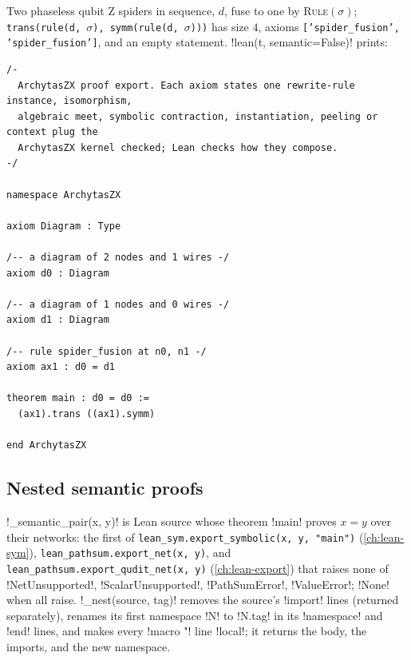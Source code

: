 \begin{example}
Two phaseless qubit Z spiders in sequence, $d$, fuse to one by \textsc{Rule}$(\sigma)$; \texttt{trans(\allowbreak{}rule(\allowbreak{}d,\allowbreak{} $\sigma$),\allowbreak{} symm(\allowbreak{}rule(\allowbreak{}d,\allowbreak{} $\sigma$)))} has size $4$, axioms \texttt{['spider\_\allowbreak{}fusion',\allowbreak{} 'spider\_\allowbreak{}fusion']}, and an empty statement. \py!lean(t, semantic=False)! prints:
\begin{lstlisting}[style=lean]
/-
  ArchytasZX proof export. Each axiom states one rewrite-rule instance, isomorphism,
  algebraic meet, symbolic contraction, instantiation, peeling or context plug the
  ArchytasZX kernel checked; Lean checks how they compose.
-/

namespace ArchytasZX

axiom Diagram : Type

/-- a diagram of 2 nodes and 1 wires -/
axiom d0 : Diagram

/-- a diagram of 1 nodes and 0 wires -/
axiom d1 : Diagram

/-- rule spider_fusion at n0, n1 -/
axiom ax1 : d0 = d1

theorem main : d0 = d0 :=
  (ax1).trans ((ax1).symm)

end ArchytasZX
\end{lstlisting}
\end{example}

\subsection{Nested semantic proofs}\label{sec:kernel-opaque-semantic}

\py!_semantic_pair(x, y)! is Lean source whose theorem \lean!main! proves $x=y$ over their networks: the first of \texttt{lean\_\allowbreak{}sym.\allowbreak{}export\_\allowbreak{}symbolic(\allowbreak{}x,\allowbreak{} y,\allowbreak{} "main")} (\cref{ch:lean-sym}), \texttt{lean\_\allowbreak{}pathsum.\allowbreak{}export\_\allowbreak{}net(\allowbreak{}x,\allowbreak{} y)}, and \texttt{lean\_\allowbreak{}pathsum.\allowbreak{}export\_\allowbreak{}qudit\_\allowbreak{}net(\allowbreak{}x,\allowbreak{} y)} (\cref{ch:lean-export}) that raises none of \py!NetUnsupported!, \py!ScalarUnsupported!, \py!PathSumError!, \py!ValueError!; \py!None! when all raise. \py!_nest(source, tag)! removes the source's \code!import! lines (returned separately), renames its first namespace \code!N! to \code!N.tag! in its \code!namespace! and \code!end! lines, and makes every \code!macro "! line \code!local!; it returns the body, the imports, and the new namespace.

